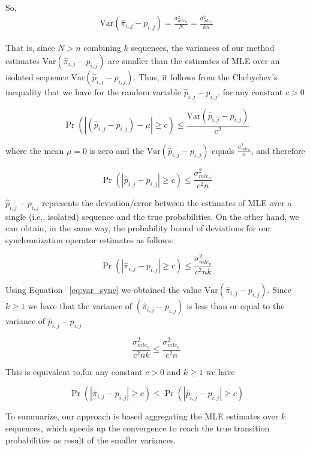 So, 
\begin{equation}
\begin{aligned}
\label{eq:var_sync}
 \mathrm{Var} (\hat{\pi}_{i,j} - {p}_{i,j}) = \frac {\sigma^{2}_{mle_N}}{N} =  \frac {\sigma^{2}_{mle_n}}{kn}
\end{aligned}
\end{equation}


That is, since $N > n$ combining $k$ sequences, the variances  of our method estimates $\mathrm{Var} (\hat{\pi}_{i,j} - {p}_{i,j})$  are smaller than the estimates of MLE over an isolated sequence $\mathrm{Var} (\hat{p}_{i,j} - {p}_{i,j})$. Thus, it follows from the  Chebyshev's inequality \cite{feller1968introduction} that we have for the random variable $\hat{p}_{i,j} - {p}_{i,j}$, for any constant $c > 0$  

\[ \Pr\left( |(\hat{p}_{i,j} - {p}_{i,j}) - \mu| \geq c \right) \leq
\frac{\mathrm{Var} (\hat{p}_{i,j} - {p}_{i,j})}{c^2} \]


 where the mean $\mu=0$ is zero and the $\mathrm{Var} (\hat{p}_{i,j} - {p}_{i,j})$ equals  $\frac {\sigma^{2}_{mle_n}}{n}$, and therefore 
 
 \[ \Pr\left( |\hat{p}_{i,j} - {p}_{i,j}| \geq c \right) \leq
 \frac{\sigma^{2}_{mle_n}}{c^2 n} \]
 
 
$\hat{p}_{i,j} - {p}_{i,j}$  represents the deviation/error between the estimates of MLE over a single (i.e., isolated) sequence and the true probabilities. On the other hand, we can obtain, in the same way, the probability bound of deviations for our synchronization operator estimates as follows:

\[ \Pr\left( |\hat{\pi}_{i,j} - {p}_{i,j}| \geq c \right) \leq
\frac{\sigma^{2}_{mle_n}}{c^2 nk} \]


Using Equation ~\ref{eq:var_sync} we obtained the value $\mathrm{Var} (\hat{\pi}_{i,j} - {p}_{i,j})$. Since $k \ge 1$ we have that the variance of $(\hat{\pi}_{i,j} - {p}_{i,j})$  is less than or equal to the variance of $\hat{p}_{i,j} - {p}_{i,j}$

\[ 
\frac{\sigma^{2}_{mle_n}}{c^2 nk} \leq
\frac{\sigma^{2}_{mle_n}}{c^2 n}
 \]

This is equivalent to,for any constant $c > 0$ and $k \ge 1$ we have

\[ \Pr\left( |\hat{\pi}_{i,j} - {p}_{i,j}| \geq c \right) \leq
 \Pr\left( |\hat{p}_{i,j} - {p}_{i,j}| \geq c \right)
 \]

To summarize, our approach is based aggregating the MLE estimates over $k$ sequences, which speeds up the convergence to reach the true transition probabilities as result of the  smaller variances.

